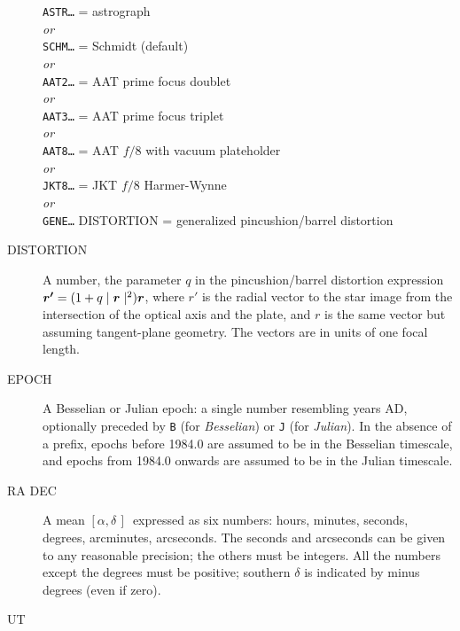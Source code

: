 \documentclass[twoside,11pt]{article}
\newcommand{\xlabel}[1]{}
\renewcommand{\_}{\texttt{\symbol{95}}}
\newcommand{\radec}     {$[\alpha,\delta\,]$}
\begin{document}
\begin{description}
 \texttt{ASTR\ldots} = astrograph \\
 \textit{or} \\
 \texttt{SCHM\ldots} = Schmidt (default) \\
 \textit{or} \\
 \texttt{AAT2\ldots} = AAT prime focus doublet \\
 \textit{or} \\
 \texttt{AAT3\ldots} = AAT prime focus triplet \\
 \textit{or} \\
 \texttt{AAT8\ldots} = AAT $f/8$ with vacuum plateholder \\
 \textit{or} \\
 \texttt{JKT8\ldots} = JKT $f/8$ Harmer-Wynne \\
 \textit{or} \\
 \texttt{GENE\ldots} DISTORTION = generalized pincushion/barrel distortion

\goodbreak
\item[\xlabel{PROJECTION}DISTORTION]\mbox{}

A number, the parameter $q$ in the pincushion/barrel distortion expression
$\mbox{\boldmath $r'$}=(1+q\mid\mbox{\boldmath $r$}\mid^2)\mbox{\boldmath $r$}$,
where \mbox{\boldmath $r'$} is the radial vector to the star image
from the intersection of the optical axis and the plate,
and \mbox{\boldmath $r$} is the same vector but assuming tangent-plane
geometry.  The vectors are in units of one focal length.

\goodbreak
\item[\xlabel{EPOCH}EPOCH]\mbox{}

A Besselian or Julian epoch:  a single number resembling years AD,
optionally preceded by \texttt{B} (for \textit{Besselian}) or
\texttt{J} (for \textit{Julian}).  In the absence of a prefix, epochs
before 1984.0 are assumed to be in the Besselian timescale, and epochs
from 1984.0 onwards are assumed to be in the Julian timescale.

\goodbreak
\item[\xlabel{RA_DEC}RA DEC]\mbox{}

A mean \radec\ expressed as six numbers: hours, minutes, seconds,
degrees, arcminutes, arcseconds.  The seconds and arcseconds can be
given to any reasonable precision;  the others must be integers.  All
the numbers except the degrees must be positive; southern $\delta$ is
indicated by minus degrees (even if zero).

\goodbreak
\item[\xlabel{UT}UT]\mbox{}


\end{description}
\end{document}

